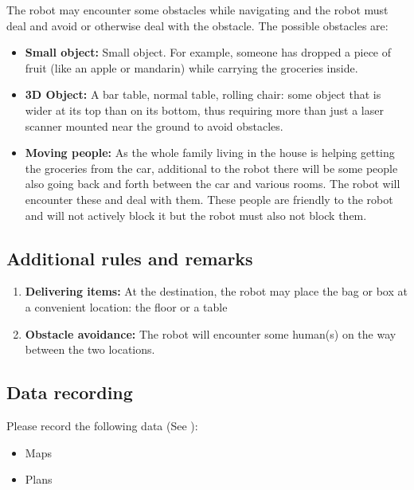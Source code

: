 The robot may encounter some obstacles while navigating and the robot must deal and avoid or otherwise deal with the obstacle. 
The possible obstacles are:
\begin{itemize}
	\item \textbf{Small object:} Small object. For example, someone has dropped a piece of fruit (like an apple or mandarin) while carrying the groceries inside.
	\item \textbf{3D Object:} A bar table, normal table, rolling chair: some object that is wider at its top than on its bottom, 
	  thus requiring more than just a laser scanner mounted near the ground to avoid obstacles. 
	\item \textbf{Moving people:} As the whole family living in the house is helping getting the groceries from the car, 
	  additional to the robot there will be some people also going back and forth between the car and various rooms. 
	  The robot will encounter these and deal with them. These people are friendly to the robot and will not actively block it but the robot must also not block them. 
\end{itemize}

\subsection{Additional rules and remarks}
\begin{enumerate}
  \item \textbf{Delivering items:} At the destination, the robot may place the bag or box at a convenient location: the floor or a table
  \item \textbf{Obstacle avoidance:} The robot will encounter some human(s) on the way between the two locations.  
\end{enumerate}

\subsection{Data recording}
  Please record the following data (See ):
  \begin{itemize}
   \item Maps
   \item Plans
  \end{itemize}

